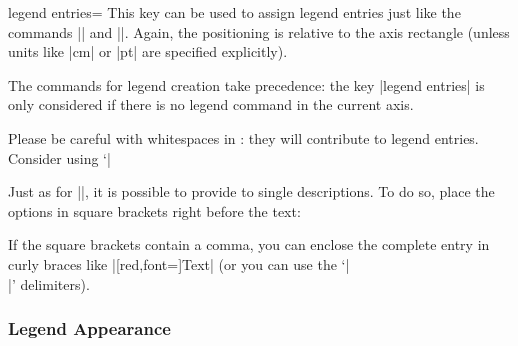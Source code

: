 \begin{pgfplotskey}{legend entries=}
	This key can be used to assign legend entries just like the commands |\addlegendentry| and |\legend|. Again, the positioning is relative to the axis rectangle (unless units like |cm| or |pt| are specified explicitly).
\begin{codeexample}[]
\end{codeexample}

	The commands for legend creation take precedence: the key |legend entries| is only considered if there is no legend command in the current axis. 
\begin{codeexample}[]
\end{codeexample}
	Please be careful with whitespaces in : they will contribute to legend entries. Consider using `|%

	Just as for |\addlegendentry|, it is possible to provide  to single descriptions. To do so, place the options in square brackets right before the text:
\begin{codeexample}[]
\end{codeexample}
	If the square brackets contain a comma, you can enclose the complete entry in curly braces like |{[red,font=\Huge]Text}| (or you can use the `|\\|' delimiters).
\end{pgfplotskey}


\subsubsection{Legend Appearance}

